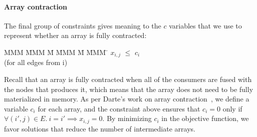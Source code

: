 


\paragraph{Array contraction} The final group of constraints gives meaning to the $c$ variables that we use to represent whether an array is fully contracted:
\begin{tabbing}
MMM     \= MMM \= M \= MMM \= M \= MMM \= \kill
        \> $x_{i,j}$    \> $\le$ \> $c_i$  \> \> \\
        \> (for all edges from i)
\end{tabbing}
Recall that an array is fully contracted when all of the consumers are fused with the nodes that produces it, which means that the array does not need to be fully materialized in memory. As per Darte's work on array contraction~\cite{darte2002contraction}, we define a variable $c_i$ for each array, and the constraint above ensures that $c_i = 0$ only if $\forall (i',j) \in E.\ i = i' \implies x_{i,j} = 0$. By minimizing $c_i$ in the objective function, we favor solutions that reduce the number of intermediate arrays.


